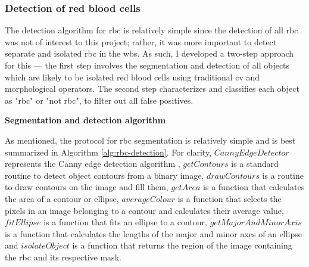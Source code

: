 \subsubsection{Detection of red blood cells}

The detection algorithm for \ac{rbc} is relatively simple since the detection of all \ac{rbc} was not of interest to this project; rather, it was more important to detect separate and isolated \ac{rbc} in the \ac{wbs}. As such, I developed a two-step approach for this --- the first step involves the segmentation and detection of all objects which are likely to be isolated red blood cells using traditional \ac{cv} and morphological operators. The second step characterizes and classifies each object as "\ac{rbc}" or "not \ac{rbc}", to filter out all false positives.

\noindent \textbf{Segmentation and detection algorithm}

As mentioned, the protocol for \ac{rbc} segmentation is relatively simple and is best summarized in Algorithm \ref{alg:rbc-detection}. For clarity, $CannyEdgeDetector$ represents the Canny edge detection algorithm \cite{Canny1986-pi}, $getContours$ is a standard routine to detect object contours from a binary image, $drawContours$ is a routine to draw contours on the image and fill them, $getArea$ is a function that calculates the area of a contour or ellipse, $averageColour$ is a function that selects the pixels in an image belonging to a contour and calculates their average value, $fitEllipse$ is a function that fits an ellipse to a contour, $getMajorAndMinorAxis$ is a function that calculates the lengths of the major and minor axes of an ellipse and $isolateObject$ is a function that returns the region of the image containing the \ac{rbc} and its respective mask. 

